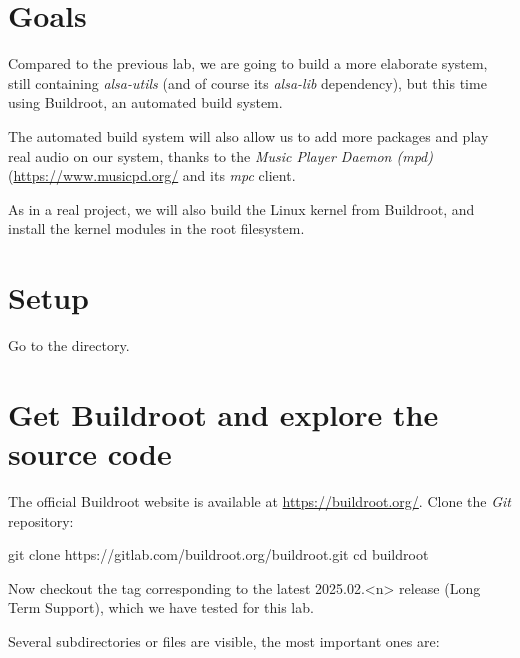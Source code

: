 
\section{Goals}

Compared to the previous lab, we are going to build a more elaborate
system, still containing {\em alsa-utils} (and of course its {\em
alsa-lib} dependency), but this time using Buildroot,
an automated build system.

The automated build system will also allow us to add more packages
and play real audio on our system, thanks to the {\em Music Player
Daemon (mpd)} (\url{https://www.musicpd.org/} and its {\em mpc} client.

As in a real project, we will also build the Linux kernel from
Buildroot, and install the kernel modules in the root filesystem.

\section{Setup}

Go to the  directory.

\section{Get Buildroot and explore the source code}

The official Buildroot website is available at
\url{https://buildroot.org/}. Clone the {\em Git} repository:

\begin{bashinput}
git clone https://gitlab.com/buildroot.org/buildroot.git
cd buildroot
\end{bashinput}

Now checkout the tag corresponding to the latest 2025.02.<n> release (Long
Term Support), which we have tested for this lab.

Several subdirectories or files are visible, the most important ones
are:

